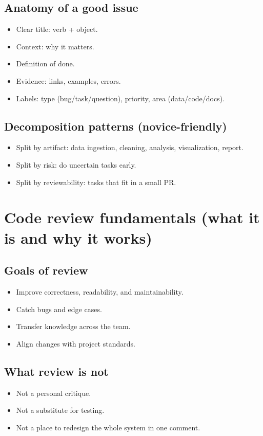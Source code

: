 \subsection{Anatomy of a good issue}
\begin{itemize}
\item Clear title: verb + object.
\item Context: why it matters.
\item Definition of done.
\item Evidence: links, examples, errors.
\item Labels: type (bug/task/question), priority, area (data/code/docs).
\end{itemize}

\subsection{Decomposition patterns (novice-friendly)}
\begin{itemize}
\item Split by artifact: data ingestion, cleaning, analysis, visualization, report.
\item Split by risk: do uncertain tasks early.
\item Split by reviewability: tasks that fit in a small PR.
\end{itemize}

\section{Code review fundamentals (what it is and why it works)}
\subsection{Goals of review}
\begin{itemize}
\item Improve correctness, readability, and maintainability.
\item Catch bugs and edge cases.
\item Transfer knowledge across the team.
\item Align changes with project standards.
\end{itemize}

\subsection{What review is not}
\begin{itemize}
\item Not a personal critique.
\item Not a substitute for testing.
\item Not a place to redesign the whole system in one comment.
\end{itemize}

